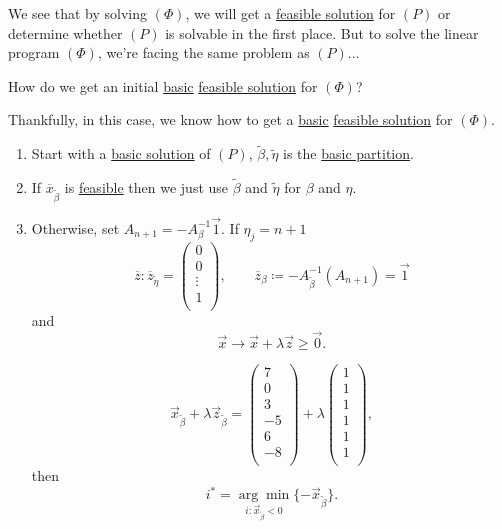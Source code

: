 We see that by solving \((\Phi)\), we will get a \hyperref[def:feasible-solution]{feasible solution} for \((P)\) or determine whether \((P)\) is solvable in the first place. But
to solve the linear program \((\Phi)\), we're facing the same problem as \((P)\)...
\begin{problem}\label{prob:phase-one-problem}
How do we get an initial \hyperref[def:basic-solution]{basic} \hyperref[def:feasible-solution]{feasible solution} for \((\Phi)\)?
\end{problem}
\begin{answer}
	Thankfully, in this case, we know how to get a \hyperref[def:basic-solution]{basic} \hyperref[def:feasible-solution]{feasible solution} for \((\Phi)\).
	\begin{enumerate}
		\item Start with a \hyperref[def:basic-solution]{basic solution} of \((P)\), \(\tilde{\beta}, \tilde{\eta}\) is the \hyperref[def:basic-partition]{basic partition}.
		\item If \(\overline{x}_{\tilde{\beta}}\) is \hyperref[def:feasible-solution]{feasible} then we just use \(\tilde{\beta}\) and \(\tilde{\eta}\) for \(\beta\) and \(\eta\).
		\item Otherwise, set \(A_{n+1} = -A^{-1}_{\beta}\vec{1}\). If \(\eta_j = n+1\)
		      \[
			      \overline{z} : \overline{z}_{\tilde{\eta}} = \begin{pmatrix}
				      0      \\
				      0      \\
				      \vdots \\
				      1      \\
			      \end{pmatrix},\qquad \overline{z}_{\beta} \coloneqq -A^{-1}_{\tilde{\beta}}(A_{n+1}) = \vec{1}
		      \]
		      and\[
			      \vec{x} \to \vec{x} + \lambda \vec{z} \geq \vec{0}.
		      \] \begin{eg}
			      \[
				      \vec{x}_{\tilde{\beta}} + \lambda \vec{z}_{\tilde{\beta}} = \begin{pmatrix}
					      7  \\
					      0  \\
					      3  \\
					      -5 \\
					      6  \\
					      -8 \\
				      \end{pmatrix} + \lambda \begin{pmatrix}
					      1 \\
					      1 \\
					      1 \\
					      1 \\
					      1 \\
					      1 \\
				      \end{pmatrix},
			      \]
			      then
			      \[
				      i^{\ast} = \underset{i:\vec{x}_{\tilde{\beta}} < 0}{\arg\min}\{-\vec{x}_{\tilde{\beta}}\}.
			      \]
		      \end{eg}
	\end{enumerate}
\end{answer}
